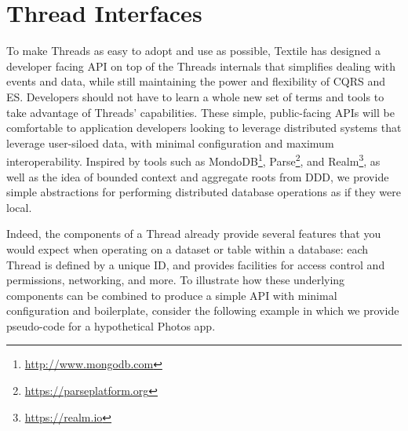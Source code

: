 \documentclass{textile}
\begin{document}



\section{Thread Interfaces}\label{sec:interfaces}

To make Threads as easy to adopt and use as possible, Textile has designed a developer facing API on top of the Threads internals that simplifies dealing with events and data, while still maintaining the power and flexibility of CQRS and ES. Developers should not have to learn a whole new set of terms and tools to take advantage of Threads' capabilities. These simple, public-facing APIs will be comfortable to application developers looking to leverage distributed systems that leverage user-siloed data, with minimal configuration and maximum interoperability. Inspired by tools such as MondoDB\footnote{\url{http://www.mongodb.com}}, Parse\footnote{\url{https://parseplatform.org}}, and Realm\footnote{\url{https://realm.io}}, as well as the idea of bounded context and aggregate roots from DDD, we provide simple abstractions for performing distributed database operations as if they were local.

Indeed, the components of a Thread already provide several features that you would expect when operating on a dataset or table within a database: each Thread is defined by a unique ID, and provides facilities for access control and permissions, networking, and more. To illustrate how these underlying components can be combined to produce a simple API with minimal configuration and boilerplate, consider the following example in which we provide pseudo-code for a hypothetical Photos app.
\end{document}

